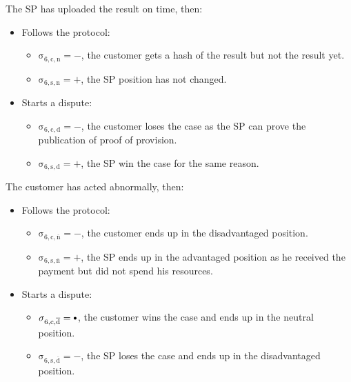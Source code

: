 \documentclass{ieeeaccess}
\newcommand\sbullet[1][.75]{\mathbin{\ThisStyle{\vcenter{\hbox{%
  \scalebox{#1}{$\SavedStyle\bullet$}}}}}%
}
\begin{document}
The SP has uploaded the result on time, then:

\begin{itemize}
\item
  Follows the protocol:

  \begin{itemize}
  
  \item
    \(\operatorname{\sigma_{6, c, n} = -}\), the customer gets a hash of the result but not the result yet.
  \item
    \(\operatorname{\sigma_{6, s, n} = +}\), the SP position has not changed.
  \end{itemize}
\item
  Starts a dispute:

  \begin{itemize}
  
  \item
    \(\operatorname{\sigma_{6, c, d} = -}\), the customer loses the case as the SP can prove the publication of proof of provision. 
  \item
    \(\operatorname{\sigma_{6, s, d} = +}\), the SP win the case for the same reason.
  \end{itemize}
\end{itemize}

The customer has acted abnormally, then:

\begin{itemize}
\item
  Follows the protocol:

  \begin{itemize}
  
  \item
    \(\operatorname{\sigma_{6, c, \overline{n}} = -}\), the customer ends up in the disadvantaged position.
  \item
    \(\operatorname{\sigma_{6, s, \overline{n}} = +}\), the SP ends up in the advantaged position as he received the payment but did not spend his resources.
  \end{itemize}
\item
  Starts a dispute:

  \begin{itemize}
  
  \item
    \(\operatorname{\sigma_{6, c, \overline{d}} = \sbullet}\), the customer wins the case and ends up in the neutral position.
  \item
    \(\operatorname{\sigma_{6, s, \overline{d}} = -}\), the SP loses the case and ends up in the disadvantaged position.
  \end{itemize}
\end{itemize}
\end{document}
